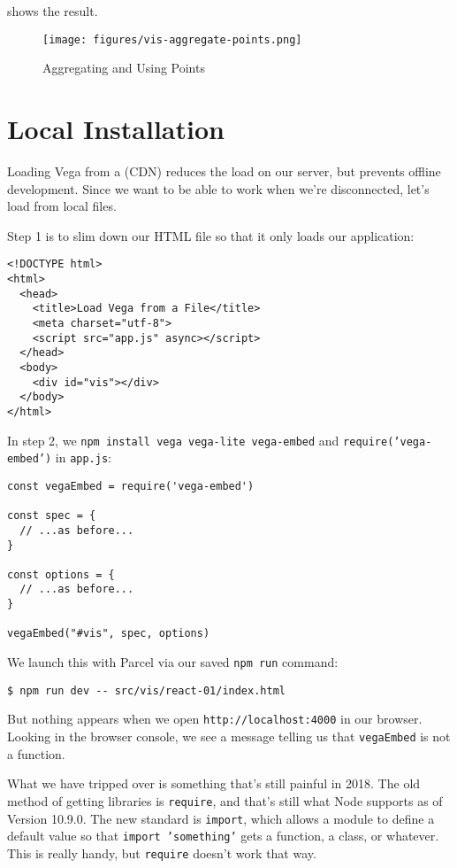  shows the result.

\begin{figure}
\centering
\texttt{[image: figures/vis-aggregate-points.png]}
\caption{Aggregating and Using Points}
\label{f:vis-aggregate-points}
\end{figure}

\section{Local Installation}\label{s:vis-vega-local}

Loading Vega from a  (CDN) reduces the load on our server,
but prevents offline development.
Since we want to be able to work when we're disconnected,
let's load from local files.

Step 1 is to slim down our HTML file so that it only loads our application:

\begin{verbatim}
<!DOCTYPE html>
<html>
  <head>
    <title>Load Vega from a File</title>
    <meta charset="utf-8">
    <script src="app.js" async></script>
  </head>
  <body>
    <div id="vis"></div>
  </body>
</html>
\end{verbatim}

In step 2,
we \texttt{npm\ install\ vega\ vega-lite\ vega-embed} and \texttt{require('vega-embed')} in \texttt{app.js}:

\begin{verbatim}
const vegaEmbed = require('vega-embed')

const spec = {
  // ...as before...
}

const options = {
  // ...as before...
}

vegaEmbed("#vis", spec, options)
\end{verbatim}

We launch this with Parcel via our saved \texttt{npm\ run} command:

\begin{verbatim}
$ npm run dev -- src/vis/react-01/index.html
\end{verbatim}

But nothing appears when we open \texttt{http://localhost:4000} in our browser.
Looking in the browser console,
we see a message telling us that \texttt{vegaEmbed} is not a function.

What we have tripped over is something that's still painful in 2018.
The old method of getting libraries is \texttt{require},
and that's still what Node supports as of Version 10.9.0.
The new standard is \texttt{import},
which allows a module to define a default value so that \texttt{import\ 'something'} gets a function, a class, or whatever.
This is really handy, but \texttt{require} doesn't work that way.

